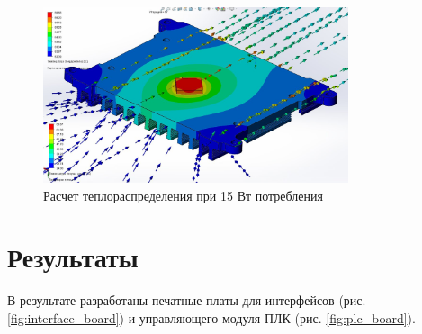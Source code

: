 \documentclass[16pt]{article}
\begin{document}
\begin{figure}
    \centering
    \includegraphics[width=0.8\textwidth]{heat.png}
    \caption{Расчет теплораспределения при 15 Вт потребления}
    \label{fig:heat_distribution}
\end{figure}

\section{Результаты}
В результате разработаны печатные платы для интерфейсов (рис. \ref{fig:interface_board}) и управляющего модуля ПЛК (рис. \ref{fig:plc_board}).
\end{document}
